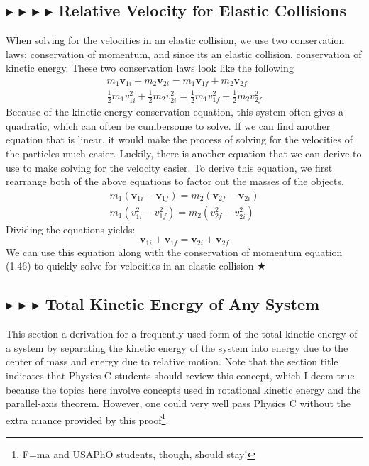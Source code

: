 \subsection{\color{OrangeRed} $\blacktriangleright$ \color{PineGreen} $\blacktriangleright$ \color{Goldenrod} $\blacktriangleright$ \color{Orchid} $\blacktriangleright$ \color{black} Relative Velocity for Elastic Collisions}
When solving for the velocities in an elastic collision, we use two conservation laws: conservation of momentum, and since its an elastic collision, conservation of kinetic energy. These two conservation laws look like the following
\begin{gather}
    m_1\mathbf{v}_{1i} + m_2\mathbf{v}_{2i} = m_1\mathbf{v}_{1f} + m_2\mathbf{v}_{2f} \\
    \frac12 m_1 v_{1i}^2 + \frac12 m_2 v_{2i}^2 = \frac12 m_1 v_{1f}^2 + \frac12 m_2 v_{2f}^2
\end{gather}
Because of the kinetic energy conservation equation, this system often gives a quadratic, which can often be cumbersome to solve. If we can find another equation that is linear, it would make the process of solving for the velocities of the particles much easier. Luckily, there is another equation that we can derive to use to make solving for the velocity easier. To derive this equation, we first rearrange both of the above equations to factor out the masses of the objects.
\begin{gather*}
    m_1(\mathbf{v}_{1i} - \mathbf{v}_{1f}) = m_2(\mathbf{v}_{2f} - \mathbf{v}_{2i}) \\
    m_1(v_{1i}^2 - v_{1f}^2) = m_2(v_{2f}^2 - v_{2i}^2)
\end{gather*}
\noindent Dividing the equations yields:
\begin{equation}
   \boxed{\mathbf{v}_{1i} + \mathbf{v}_{1f} = \mathbf{v}_{2i} + \mathbf{v}_{2f}} 
\end{equation}
\noindent We can use this equation along with the conservation of momentum equation (1.46) to quickly solve for velocities in an elastic collision $\bigstar$

\subsection{\color{PineGreen} $\blacktriangleright$ \color{Goldenrod} $\blacktriangleright$ \color{Orchid} $\blacktriangleright$ \color{black} Total Kinetic Energy of Any System} \label{1.3.5}
This section a derivation for a frequently used form of the total kinetic energy of a system by separating the kinetic energy of the system into energy due to the center of mass and energy due to relative motion. Note that the section title indicates that Physics C students should review this concept, which I deem true because the topics here involve concepts used in rotational kinetic energy and the parallel-axis theorem. However, one could very well pass Physics C without the extra nuance provided by this proof\footnote{F=ma and USAPhO students, though, should stay!}.

